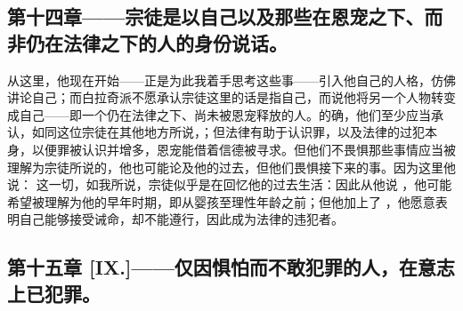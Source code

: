 
\subsection{第十四章——宗徒是以自己以及那些在恩宠之下、而非仍在法律之下的人的身份说话。}

从这里，他现在开始——正是为此我着手思考这些事——引入他自己的人格，仿佛讲论自己；而白拉奇派不愿承认宗徒这里的话是指自己，而说他将另一个人物转变成自己——即一个仍在法律之下、尚未被恩宠释放的人。的确，他们至少应当承认，如同这位宗徒在其他地方所说，；但法律有助于认识罪，以及法律的过犯本身，以便罪被认识并增多，恩宠能借着信德被寻求。但他们不畏惧那些事情应当被理解为宗徒所说的，他也可能论及他的过去，但他们畏惧接下来的事。因为这里他说： 这一切，如我所说，宗徒似乎是在回忆他的过去生活：因此从他说 ，他可能希望被理解为他的早年时期，即从婴孩至理性年龄之前；但他加上了 ，他愿意表明自己能够接受诫命，却不能遵行，因此成为法律的违犯者。\par


\subsection{第十五章 [IX.]——仅因惧怕而不敢犯罪的人，在意志上已犯罪。}

